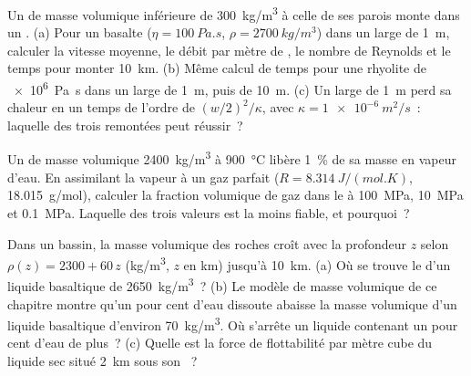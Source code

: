\begin{exercise}[$\star\star$]\label{exo:b2:magma-emplacement:6}
Un  de masse volumique inférieure de \qty{300}{kg/m^3} à celle de ses parois monte dans un .
(a) Pour un basalte ($\eta = \qty{100}{Pa.s}$, $\rho = \qty{2700}{kg/m^3}$) dans un 
large de \qty{1}{m}, calculer la vitesse moyenne, le débit par mètre de , le
nombre de Reynolds et le temps pour monter \qty{10}{km}. (b) Même calcul de temps pour une rhyolite de
\qty{e6}{Pa.s} dans un  large de \qty{1}{m}, puis de \qty{10}{m}. (c) Un 
large de \qty{1}{m} perd sa chaleur en un temps de l'ordre de $(w/2)^2/\kappa$, avec $\kappa =
\qty{1e-6}{m^2/s}$~: laquelle des trois remontées peut réussir~?
\end{exercise}

\begin{exercise}[$\star\star$]\label{exo:b2:magma-emplacement:7}
Un  de masse volumique \qty{2400}{kg/m^3} à \qty{900}{\celsius} libère
\qty{1}{\percent} de sa masse en vapeur d'eau. En assimilant la vapeur à un gaz parfait
($R = \qty{8.314}{J/(mol.K)}$, \qty{18.015}{g/mol}), calculer la fraction volumique de
gaz dans le  à \qty{100}{MPa}, \qty{10}{MPa} et \qty{0.1}{MPa}. Laquelle des
trois valeurs est la moins fiable, et pourquoi~?
\end{exercise}

\begin{exercise}[$\star\star$]\label{exo:b2:magma-emplacement:8}
Dans un bassin, la masse volumique des roches croît avec la profondeur $z$ selon $\rho(z) =
2300 + 60\,z$ (\unit{kg/m^3}, $z$ en \unit{km}) jusqu'à \qty{10}{km}. (a) Où se trouve
le  d'un liquide basaltique de \qty{2650}{kg/m^3}~? (b) Le
modèle de masse volumique de ce chapitre montre qu'un pour cent d'eau dissoute abaisse
la masse volumique d'un liquide basaltique d'environ \qty{70}{kg/m^3}. Où s'arrête un liquide
contenant un pour cent d'eau de plus~? (c) Quelle est la force de flottabilité par mètre cube
du liquide sec situé \qty{2}{km} sous son ~?
\end{exercise}

